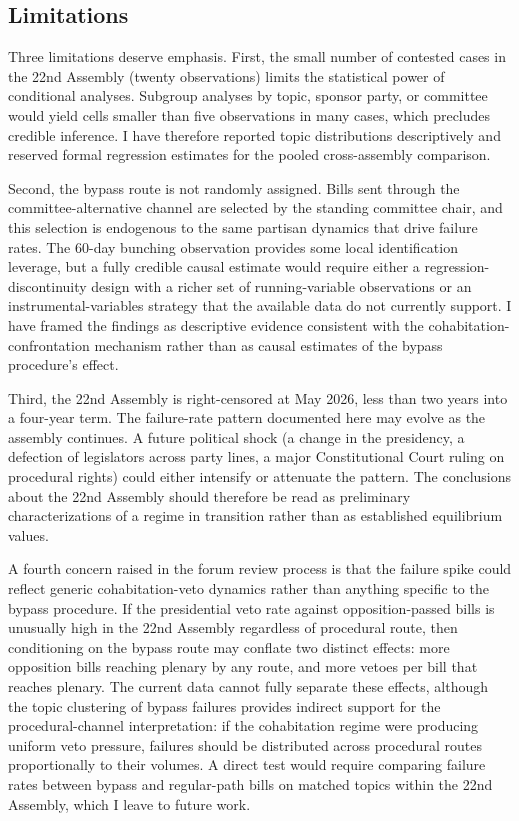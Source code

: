 \documentclass[11pt]{article}
\begin{document}
\subsection{Limitations}

Three limitations deserve emphasis. First, the small number of contested cases in the 22nd Assembly (twenty observations) limits the statistical power of conditional analyses. Subgroup analyses by topic, sponsor party, or committee would yield cells smaller than five observations in many cases, which precludes credible inference. I have therefore reported topic distributions descriptively and reserved formal regression estimates for the pooled cross-assembly comparison.

Second, the bypass route is not randomly assigned. Bills sent through the committee-alternative channel are selected by the standing committee chair, and this selection is endogenous to the same partisan dynamics that drive failure rates. The 60-day bunching observation provides some local identification leverage, but a fully credible causal estimate would require either a regression-discontinuity design with a richer set of running-variable observations or an instrumental-variables strategy that the available data do not currently support. I have framed the findings as descriptive evidence consistent with the cohabitation-confrontation mechanism rather than as causal estimates of the bypass procedure's effect.

Third, the 22nd Assembly is right-censored at May 2026, less than two years into a four-year term. The failure-rate pattern documented here may evolve as the assembly continues. A future political shock (a change in the presidency, a defection of legislators across party lines, a major Constitutional Court ruling on procedural rights) could either intensify or attenuate the pattern. The conclusions about the 22nd Assembly should therefore be read as preliminary characterizations of a regime in transition rather than as established equilibrium values.

A fourth concern raised in the forum review process is that the failure spike could reflect generic cohabitation-veto dynamics rather than anything specific to the bypass procedure. If the presidential veto rate against opposition-passed bills is unusually high in the 22nd Assembly regardless of procedural route, then conditioning on the bypass route may conflate two distinct effects: more opposition bills reaching plenary by any route, and more vetoes per bill that reaches plenary. The current data cannot fully separate these effects, although the topic clustering of bypass failures provides indirect support for the procedural-channel interpretation: if the cohabitation regime were producing uniform veto pressure, failures should be distributed across procedural routes proportionally to their volumes. A direct test would require comparing failure rates between bypass and regular-path bills on matched topics within the 22nd Assembly, which I leave to future work.
\end{document}
